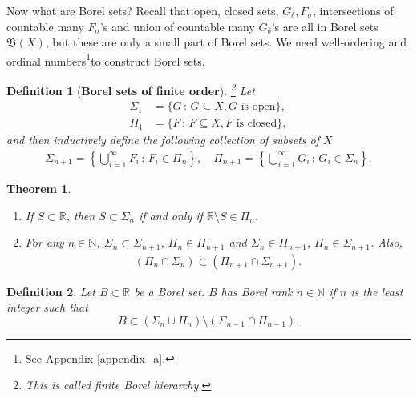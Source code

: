 \documentclass[11pt]{book}
\newtheorem{definition}{Definition}[chapter]
\newtheorem{theorem}{Theorem}[chapter]
\theoremstyle{definition}
\numberwithin{equation}{chapter}
\begin{document}
\medskip

Now what are Borel sets? Recall that open, closed sets, $G_\delta, F_\sigma$, intersections of countable many $F_\sigma$'s and union of countable many $G_\delta$'s are all in Borel sets $\mathfrak{B}(X)$, but these are only a small part of Borel sets. We need well-ordering and ordinal numbers\footnote{See Appendix \ref{appendix_a}.}to construct Borel sets.

\medskip


\begin{definition}[{\bf Borel sets of finite order}]\footnote{This is called {\em finite Borel hierarchy}.}
Let
\begin{align*}
    \Sigma_1 & = \{G\,:\, G \subseteq X, G\,\, \text{is open}\}, \\
    \Pi_1 & = \{F\,:\, F \subseteq X, F\,\, \text{is closed}\},
\end{align*}
and then inductively define the following collection of subsets of $X$
\begin{align*}
    \Sigma_{n+1} = \left\{\bigcup^\infty_{i=1} F_i \,:\, F_i \in \Pi_{n}\right\}, \quad \Pi_{n+1} = \left\{\bigcup^\infty_{i=1} G_i \,:\, G_i \in \Sigma_{n}\right\}.
\end{align*}
\end{definition}

\medskip

\begin{theorem}
~\begin{enumerate}[label=(\alph*)]
    \item If $S \subset \mathbb{R}$, then $S \subset \Sigma_{n}$ if and only if $\mathbb{R} \setminus S \in \Pi_{n}$.
    
    \item For any $n \in \mathbb{N}$, $\Sigma_{n} \subset \Sigma_{n+1}$, $\Pi_{n} \in \Pi_{n+1}$ and $\Sigma_{n} \in \Pi_{n+1}$, $\Pi_{n} \in \Sigma_{n+1}$. Also, 
    \begin{align*}
        \left(\Pi_{n} \cap \Sigma_{n}\right) \subset \left(\Pi_{n+1} \cap \Sigma_{n+1}\right).
    \end{align*}
\end{enumerate}
\end{theorem}

\medskip

\begin{definition}
Let $B \subset \mathbb{R}$ be a Borel set. $B$ has Borel rank $n \in \mathbb{N}$ if $n$ is the least integer such that $$B \subset \left(\Sigma_n \cup \Pi_n \right) \setminus \left(\Sigma_{n-1} \cap \Pi_{n-1}\right).$$
\end{definition}
\end{document}
